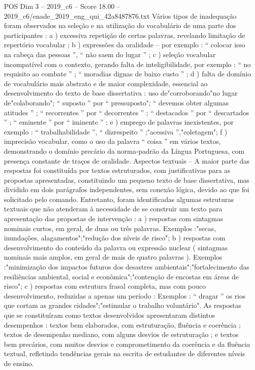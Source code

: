 \begin{textsample}{POS Dim 3 – 2019\_c6 – Score 18.00 – 2019\_c6/enade\_2019\_eng\_qui\_42a8487876.txt}
Vários tipos de inadequação foram observados na seleção e na utilização do vocabulário de uma parte dos participantes : a ) excessiva repetição de certas palavras, revelando limitação de repertório vocabular ; b ) expressões da oralidade – por exemplo : “ colocar isso na cabeça das pessoas ”, “ não saem do lugar ” ; c ) seleção vocabular incompatível com o contexto, gerando falta de inteligibilidade, por exemplo : “ no requisito ao combate ” ; “ moradias dignas de baixo custo ” ; d ) falta de domínio de vocabulário mais abstrato e de maior complexidade, essencial ao desenvolvimento do texto de base dissertativa : uso de"corroborando"no lugar de"colaborando"; “ suposto ” por “ pressuposto"; “ devemos obter algumas atitudes ” ; “ recorrentes ” por “ decorrentes ” ; “ destacados ” por “ descartados ” ; “ eminente ” por “ iminente ” ; e ) emprego de palavras inexistentes, por exemplo : “ trabalhabilidade ”, “ dizrespeito ” ;"acessiva ”,"coletagem"; f ) imprecisão vocabular, como o uso da palavra “ coisa ” em vários textos, demonstrando o domínio precário da norma-padrão da Língua Portuguesa, com presença constante de traços de oralidade.
Aspectos textuais – A maior parte das respostas foi constituída por textos estruturados, com justificativas para as propostas apresentadas, constituindo um pequeno texto de base dissertativa, mas dividido em dois parágrafos independentes, sem conexão lógica, devido ao que foi solicitado pelo comando.
Entretanto, foram identificadas algumas estruturas textuais que não atenderam à necessidade de se construir um texto para apresentação das propostas de intervenção : a ) respostas com sintagmas nominais curtos, em geral, de duas ou três palavras.
Exemplos :"secas, inundações, alagamentos";"redução dos níveis de risco"; b ) respostas com desenvolvimento do conteúdo da palavra ou expressão nuclear ( sintagmas nominais mais amplos, em geral de mais de quatro palavras ).
Exemplos :"minimização dos impactos futuros dos desastres ambientais";"fortalecimento das resiliências ambiental, social e econômica";"contenção de encostas em áreas de risco"; c ) respostas com estrutura frasal completa, mas com pouco desenvolvimento, reduzidas a apenas um período : Exemplos : “ dragar ” os rios que cortam as grandes cidades";"estimular o trabalho voluntário".
As respostas que se constituíram como textos desenvolvidos apresentaram distintos desempenhos : textos bem elaborados, com estruturação, fluência e coerência ; textos de desempenho mediano, com alguns desvios de estruturação ; e textos bem precários, com muitos desvios e comprometimento da coerência e da fluência textual, refletindo tendências gerais na escrita de estudantes de diferentes níveis de ensino.

\end{textsample}
